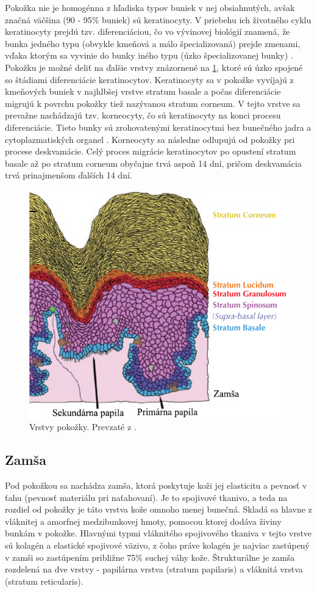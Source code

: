   Pokožka nie je homogénna z hľadiska typov buniek v nej obsiahnutých, avšak značná väčšina (90 - 95\% buniek) sú keratinocyty. V priebehu 
  ich životného cyklu keratinocyty prejdú tzv. diferenciáciou, čo vo vývinovej biológií znamená, že bunka jedného typu (obvykle kmeňová a  málo špecializovaná)
  prejde zmenami, vďaka ktorým sa vyvinie do bunky iného typu (úzko špecializovanej bunky) \cite{slack2012biology}. Pokožku je možné deliť na ďalšie
  vrstvy znázornené na \ref{obr:pokozka_vrstvy}, ktoré sú úzko spojené so štádiami diferenciácie keratinocytov. Keratinocyty sa v pokožke vyvíjajú
  z kmeňových buniek v najhlbšej vrstve stratum basale a počas diferenciácie migrujú k povrchu pokožky tiež nazývanou stratum corneum. V tejto vrstve sa 
  prevažne nachádzajú tzv. korneocyty, čo sú keratinocyty na konci procesu diferenciácie. Tieto bunky sú zrohovatenými keratinocytmi bez bunečného jadra
  a cytoplazmatiských organel \cite{koster2009epidermis}. Korneocyty sa následne odlupujú od pokožky pri procese deskvamácie. Celý proces migrácie
  keratinocytov po opustení stratum basale až po stratum corneum obyčajne trvá aspoň 14 dní, pričom deskvamácia trvá prinajmenšom ďalších 14 dní.

  \begin{figure}[h]
    \centering
    \includegraphics[width=0.65\linewidth]{obrazky-figures/pokozka_vrstvy.png} %
    \caption{Vrstvy pokožky. Prevzaté z \cite{FingerprintSrcBook}.}
    \label{obr:pokozka_vrstvy}
  \end{figure}

  \subsection{Zamša}
  Pod pokožkou sa nachádza zamša, ktorá poskytuje koži jej elasticitu a pevnosť v ťahu (pevnosť materiálu pri naťahovaní). Je to spojivové tkanivo,
  a teda na rozdiel od pokožky je táto vrstva kože omnoho menej bunečná. Skladá sa hlavne z vláknitej a amorfnej medzibunkovej hmoty, pomocou ktorej dodáva
  živiny bunkám v pokožke. Hlavnými typmi vláknitého spojivového tkaniva v tejto vrstve sú kolagén a elastické spojivové väzivo, z čoho práve kolagén je
  najviac zastúpený v zamši so zastúpením približne 75\% suchej váhy kože. Štrukturálne je zamša rozdelená na dve vrstvy - papilárna vrstva (stratum papilaris)
  a vláknitá vrstva (stratum reticularis).


